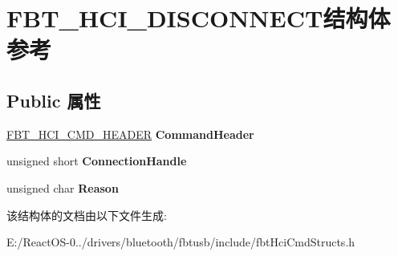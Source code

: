 \hypertarget{struct_f_b_t___h_c_i___d_i_s_c_o_n_n_e_c_t}{}\section{F\+B\+T\+\_\+\+H\+C\+I\+\_\+\+D\+I\+S\+C\+O\+N\+N\+E\+C\+T结构体 参考}
\label{struct_f_b_t___h_c_i___d_i_s_c_o_n_n_e_c_t}
\subsection*{Public 属性}
\begin{DoxyCompactItemize}
\item 
\mbox{\label{struct_f_b_t___h_c_i___d_i_s_c_o_n_n_e_c_t_a73b88f270c53a2e73e8f36d0c2e9b653}} 
\hyperlink{struct_f_b_t___h_c_i___c_m_d___h_e_a_d_e_r}{F\+B\+T\+\_\+\+H\+C\+I\+\_\+\+C\+M\+D\+\_\+\+H\+E\+A\+D\+ER} {\bfseries Command\+Header}
\item 
\mbox{\label{struct_f_b_t___h_c_i___d_i_s_c_o_n_n_e_c_t_abcf58ba2693b3813608a808b4ebf0433}} 
unsigned short {\bfseries Connection\+Handle}
\item 
\mbox{\label{struct_f_b_t___h_c_i___d_i_s_c_o_n_n_e_c_t_abfabd72f0ef01cff445cfcc62487f6e8}} 
unsigned char {\bfseries Reason}
\end{DoxyCompactItemize}


该结构体的文档由以下文件生成\+:\begin{DoxyCompactItemize}
\item 
E\+:/\+React\+O\+S-\/0../drivers/bluetooth/fbtusb/include/fbt\+Hci\+Cmd\+Structs.\+h\end{DoxyCompactItemize}
